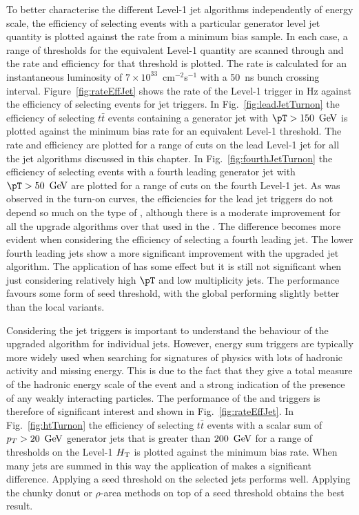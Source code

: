 To better characterise the different Level-1 jet algorithms independently of energy
scale, the efficiency of selecting events with a particular generator
level jet quantity is plotted against the rate from a minimum bias
sample. In each case, a range of thresholds for the equivalent Level-1
quantity are scanned through and the rate and efficiency for that
threshold is plotted. The rate is calculated for an instantaneous luminosity
of $7\times10^{33}$~cm$^{-2}$s$^{-1}$ with a 50~ns \LHC bunch crossing
interval. Figure~\ref{fig:rateEffJet} shows the rate of the Level-1
trigger in Hz against the efficiency of selecting events for jet
triggers. In Fig.~\ref{fig:leadJetTurnon} the efficiency of
selecting $t\bar{t}$ events containing a generator jet with
$\pT>150~\gev$ is plotted against the minimum bias rate for an
equivalent Level-1 threshold. The rate and efficiency are plotted for
a range of cuts on the lead Level-1 jet for all the jet algorithms
discussed in this chapter. In Fig.~\ref{fig:fourthJetTurnon} the
efficiency of selecting events with a fourth leading generator jet
with $\pT>50~\gev$ are plotted for a range of cuts on the fourth Level-1
jet. As was observed in the turn-on curves, the efficiencies for the
lead jet triggers do not depend so much on the type of \PUS, although
there is a moderate improvement for all the upgrade algorithms over
that used in the \GCT. The difference becomes more evident when
considering the efficiency of selecting a fourth leading jet. The
lower \pT fourth leading jets show a more significant improvement with
the upgraded jet algorithm. The application of \PUS has some effect
but it is still not significant when just considering relatively high
$\pT$ and low multiplicity jets. The performance favours some form of
seed threshold, with the global \PUS performing slightly better than
the local variants.

Considering the jet triggers is important to understand the
behaviour of the upgraded algorithm for individual jets. However,
energy sum triggers are typically more widely used when searching for
signatures of \BSM physics with lots of hadronic activity and missing
energy. This is due to the fact that they give a total measure of the
hadronic energy scale of the event and a strong indication of the
presence of any weakly interacting particles. The performance of the
\HT and \MHT triggers is therefore of significant interest and shown
in Fig.~\ref{fig:rateEffJet}. In Fig.~\ref{fig:htTurnon} the
efficiency of selecting $t\bar{t}$ events with a scalar sum of $p_T>20~\mathrm{\,Ge\kern -0.1em V}$
generator jets that is greater than $200~\mathrm{\,Ge\kern -0.1em V}$ for a range of
thresholds on the Level-1 $\mbox{$H_\text{T}$}$ is plotted against the minimum bias
rate. When many jets are summed in this way the application of \PUS
makes a significant difference. Applying a seed threshold on the
selected jets performs well. Applying the chunky donut or
$\rho$-area \PUS methods on top of a seed threshold obtains the best result.

